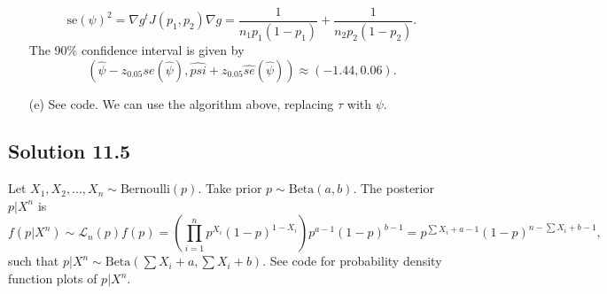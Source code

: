 \begin{itemize}
\begin{equation*}
            \mathrm{se}(\psi)^2
                = \nabla g^t J(p_1, p_2) \nabla g
                = \frac{1}{n_1 p_1 (1 - p_1)} + \frac{1}{n_2 p_2 (1 - p_2)}.
        \end{equation*}
        The 90\% confidence interval is given by
        \begin{equation*}
            (\hat{\psi} - z_{0.05}\hat{se}(\hat{\psi}), \hat{psi} + z_{0.05}\hat{se}(\hat{\psi}))
            \approx (-1.44, 0.06).
        \end{equation*}
    \item[(e)] See code.
        We can use the algorithm above, replacing $\tau$ with $\psi$.
\end{itemize}


\subsection*{Solution 11.5}

Let $X_1, X_2, ..., X_{n} \sim \mathrm{Bernoulli}(p)$.
Take prior $p \sim \mathrm{Beta}(a, b)$.
The posterior $p|X^n$ is
\begin{equation*}
    f(p|X^n) \sim \mathcal{L}_n(p) f(p)
        = \left(\prod_{i = 1}^n p^{X_i}(1 - p)^{1 - X_i}\right) p^{a - 1} (1 - p)^{b - 1}
        = p^{\sum X_i + a - 1} (1 - p)^{n - \sum X_i + b - 1},
\end{equation*}
such that $p|X^n \sim \mathrm{Beta}(\sum X_i + a, \sum X_i + b)$.
See code for probability density function plots of $p|X^n$.
